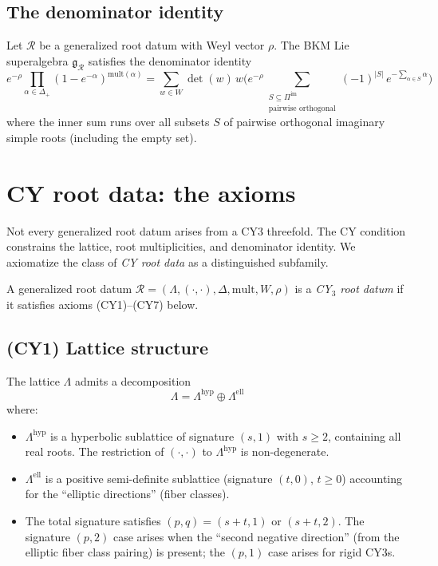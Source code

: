 \subsection{The denominator identity}
\label{ssec:denominator-identity}

\begin{proposition}
\label{prop:wkb-denominator}

Let $\mathcal{R}$ be a generalized root datum with Weyl vector $\rho$. The BKM Lie superalgebra $\mathfrak{g}_\mathcal{R}$ satisfies the denominator identity
\[
 e^{-\rho} \prod_{\alpha \in \Delta_+} (1 - e^{-\alpha})^{\mathrm{mult}(\alpha)}
 = \sum_{w \in W} \det(w) \, w \biggl( e^{-\rho} \sum_{\substack{S \subseteq \Pi^{\mathrm{im}} \\ \text{pairwise orthogonal}}} (-1)^{|S|} \, e^{-\sum_{\alpha \in S} \alpha} \biggr)
\]
where the inner sum runs over all subsets $S$ of pairwise orthogonal imaginary simple roots (including the empty set).
\end{proposition}


\section{CY root data: the axioms}
\label{sec:cy-root-data-axioms}

Not every generalized root datum arises from a CY3 threefold. The CY condition constrains the lattice, root multiplicities, and denominator identity. We axiomatize the class of \emph{CY root data} as a distinguished subfamily.

\begin{definition}
\label{def:cy3-root-datum}
A generalized root datum $\mathcal{R} = (\Lambda, (\cdot,\cdot), \Delta, \mathrm{mult}, W, \rho)$ is a \emph{CY$_3$ root datum} if it satisfies axioms (CY1)--(CY7) below.
\end{definition}

\subsection*{(CY1) Lattice structure}

The lattice $\Lambda$ admits a decomposition
\[
 \Lambda = \Lambda^{\mathrm{hyp}} \oplus \Lambda^{\mathrm{ell}}
\]
where:
\begin{itemize}
 \item $\Lambda^{\mathrm{hyp}}$ is a hyperbolic sublattice of signature $(s, 1)$ with $s \geq 2$, containing all real roots. The restriction of $(\cdot,\cdot)$ to $\Lambda^{\mathrm{hyp}}$ is non-degenerate.
 \item $\Lambda^{\mathrm{ell}}$ is a positive semi-definite sublattice (signature $(t, 0)$, $t \geq 0$) accounting for the ``elliptic directions'' (fiber classes).
 \item The total signature satisfies $(p, q) = (s + t, 1)$ or $(s + t, 2)$. The signature $(p,2)$ case arises when the ``second negative direction'' (from the elliptic fiber class pairing) is present; the $(p,1)$ case arises for rigid CY3s.
\end{itemize}

